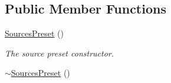 \subsection*{Public Member Functions}
\begin{DoxyCompactItemize}
\item 
\hyperlink{class_hoa2_d_1_1_sources_preset_aafde5df31f71153b72204466d443fc60}{Sources\-Preset} ()
\begin{DoxyCompactList}\small\item\em The source preset constructor. \end{DoxyCompactList}\item 
\hypertarget{class_hoa2_d_1_1_sources_preset_a2cc55290d42ea26d556c76845ac289c6}{\hyperlink{class_hoa2_d_1_1_sources_preset_a2cc55290d42ea26d556c76845ac289c6}{$\sim$\-Sources\-Preset} ()}\label{class_hoa2_d_1_1_sources_preset_a2cc55290d42ea26d556c76845ac289c6}


\end{DoxyCompactItemize}
